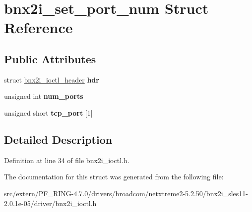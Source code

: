 \hypertarget{structbnx2i__set__port__num}{
\section{bnx2i\_\-set\_\-port\_\-num Struct Reference}
\label{structbnx2i__set__port__num}
}
\subsection*{Public Attributes}
\begin{DoxyCompactItemize}
\item 
\hypertarget{structbnx2i__set__port__num_a0cf54d84aafd06140e82400918725b1b}{
struct \hyperlink{structbnx2i__ioctl__header}{bnx2i\_\-ioctl\_\-header} {\bfseries hdr}}
\label{structbnx2i__set__port__num_a0cf54d84aafd06140e82400918725b1b}

\item 
\hypertarget{structbnx2i__set__port__num_a4889265fcc05f28cced559f97c0185f1}{
unsigned int {\bfseries num\_\-ports}}
\label{structbnx2i__set__port__num_a4889265fcc05f28cced559f97c0185f1}

\item 
\hypertarget{structbnx2i__set__port__num_a0f58f1be94569131aa531ccd7cfb5b43}{
unsigned short {\bfseries tcp\_\-port} \mbox{[}1\mbox{]}}
\label{structbnx2i__set__port__num_a0f58f1be94569131aa531ccd7cfb5b43}

\end{DoxyCompactItemize}


\subsection{Detailed Description}


Definition at line 34 of file bnx2i\_\-ioctl.h.



The documentation for this struct was generated from the following file:\begin{DoxyCompactItemize}
\item 
src/extern/PF\_\-RING-\/4.7.0/drivers/broadcom/netxtreme2-\/5.2.50/bnx2i\_\-sles11-\/2.0.1e-\/05/driver/bnx2i\_\-ioctl.h\end{DoxyCompactItemize}
